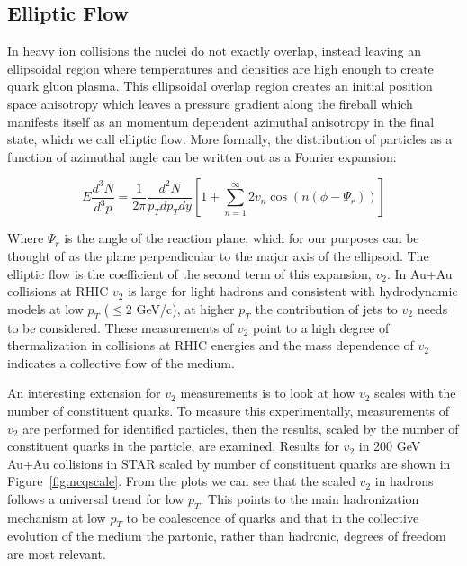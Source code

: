 \subsection{Elliptic Flow}

In heavy ion collisions the nuclei do not exactly overlap, instead leaving an ellipsoidal region where temperatures and densities are high enough to create quark gluon plasma. This ellipsoidal overlap region creates an initial position space anisotropy which leaves a pressure gradient along the fireball which manifests itself as an momentum dependent azimuthal anisotropy in the final state, which we call elliptic flow. More formally, the distribution of particles as a function of azimuthal angle can be written out as a Fourier expansion:

\begin{equation}\label{eq:v2def}
E\frac{d^3N}{d^3p} = \frac{1}{2\pi}\frac{d^2N}{p_Tdp_Tdy}[1 + \sum_{n=1}^{\infty}2 v_n \cos(n(\phi - \Psi_r))]
\end{equation}

Where $\Psi_r$ is the angle of the reaction plane, which for our purposes can be thought of as the plane perpendicular to the major axis of the ellipsoid. The elliptic flow is the coefficient of the second term of this expansion, $v_2$. In Au+Au collisions at RHIC $v_2$ is large for light hadrons and consistent with hydrodynamic models at low $p_T$ ($\leq 2$ GeV/c), at higher $p_T$ the contribution of jets to $v_2$ needs to be considered. These measurements of $v_2$ point to a high degree of thermalization in collisions at RHIC energies and the mass dependence of $v_2$ indicates a collective flow of the medium.

An interesting extension for $v_2$ measurements is to look at how $v_2$ scales with the number of constituent quarks. To measure this experimentally, measurements of $v_2$ are performed for identified particles, then the results, scaled by the number of constituent quarks in the particle, are examined. Results for $v_2$ in 200 GeV Au+Au collisions in STAR scaled by number of constituent quarks are shown in Figure~\ref{fig:ncqscale}. From the plots we can see that the scaled $v_2$ in hadrons follows a universal trend for low $p_T$. This points to the main hadronization mechanism at low $p_T$ to be coalescence of quarks and that in the collective evolution of the medium the partonic, rather than hadronic, degrees of freedom are most relevant. 


